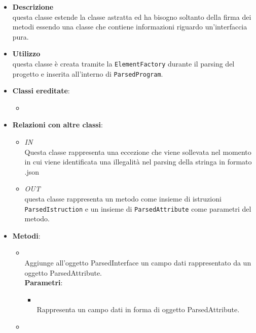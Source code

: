 \begin{itemize}
\item \textbf{Descrizione}\\
questa classe estende la classe astratta  ed ha bisogno soltanto della firma dei metodi essendo una classe che contiene informazioni riguardo un'interfaccia pura.
\item \textbf{Utilizzo}\\
questa classe è creata tramite la \texttt{ElementFactory} durante il parsing del progetto e inserita all'interno di \texttt{ParsedProgram}.
\item \textbf{Classi ereditate}:
\begin{itemize}
\item \hyperref[\nogloxy{swedesigner::server::project::ParsedType}]{}
\end{itemize}
\item \textbf{Relazioni con altre classi}:
\begin{itemize}
\item \textit{IN} \hyperref[\nogloxy{swedesigner::server::project::ParsedException}]{}\\
Questa classe rappresenta una eccezione che viene sollevata nel momento in cui viene identificata una illegalità nel parsing della stringa in formato .json
\item \textit{OUT} \hyperref[\nogloxy{swedesigner::server::project::ParsedMethod}]{}\\
questa classe rappresenta un metodo come insieme di istruzioni \texttt{ParsedIstruction} e un insieme di \texttt{ParsedAttribute} come parametri del metodo.
\end{itemize}
\item \textbf{Metodi}:
\begin{itemize}
\item {}
\\ Aggiunge all'oggetto ParsedInterface un campo dati rappresentato da un oggetto ParsedAttribute.
\\ \textbf{Parametri}:
\begin{itemize}
\item {}
\\ Rappresenta un campo dati in forma di oggetto ParsedAttribute.
\end{itemize}
\item {}

\end{itemize}
\end{itemize}
